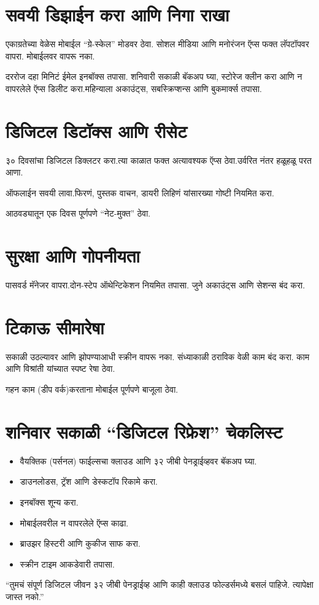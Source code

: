 \section*{सवयी डिझाईन करा आणि निगा राखा}

एकाग्रतेच्या वेळेस मोबाईल “ग्रे-स्केल” मोडवर ठेवा. सोशल मीडिया आणि मनोरंजन ऍप्स फक्त लॅपटॉपवर वापरा.
मोबाईलवर वापरू नका.

दररोज दहा मिनिटं ईमेल इनबॉक्स तपासा. शनिवारी सकाळी बॅकअप घ्या, स्टोरेज क्लीन करा आणि न वापरलेले ऍप्स डिलीट करा.महिन्याला अकाउंट्स, सबस्क्रिप्शन्स आणि बुकमार्क्स तपासा.


\section*{डिजिटल डिटॉक्स आणि रीसेट}

३० दिवसांचा डिजिटल डिक्लटर  करा.त्या काळात फक्त अत्यावश्यक ऍप्स ठेवा.उर्वरित नंतर हळूहळू परत आणा.

ऑफलाईन सवयी लावा.फिरणं, पुस्तक वाचन, डायरी लिहिणं यांसारख्या गोष्टी नियमित करा.

आठवड्यातून एक दिवस पूर्णपणे “नेट-मुक्त” ठेवा.



\section*{सुरक्षा आणि गोपनीयता}

पासवर्ड मॅनेजर वापरा.दोन-स्टेप ऑथेन्टिकेशन नियमित तपासा. जुने अकाउंट्स आणि सेशन्स बंद करा.



\section*{टिकाऊ सीमारेषा}

सकाळी उठल्यावर आणि झोपण्याआधी स्क्रीन वापरू नका. संध्याकाळी ठराविक वेळी काम बंद करा. काम आणि विश्रांती यांच्यात स्पष्ट रेषा ठेवा.

गहन काम (डीप वर्क)करताना मोबाईल पूर्णपणे बाजूला ठेवा.



\section*{शनिवार सकाळी “डिजिटल रिफ्रेश” चेकलिस्ट}

\begin{itemize}
\item  वैयक्तिक (पर्सनल) फाईल्सचा क्लाउड आणि ३२ जीबी  पेनड्राईव्हवर बॅकअप घ्या.
\item  डाउनलोडस, ट्रॅश  आणि डेस्कटॉप रिकामे करा.
\item इनबॉक्स शून्य करा.
\item मोबाईलवरील न वापरलेले ऍप्स काढा.
\item ब्राउझर हिस्टरी आणि कुकीज साफ करा.
\item स्क्रीन टाइम आकडेवारी तपासा.
\end{itemize}


“तुमचं संपूर्ण डिजिटल जीवन ३२ जीबी  पेनड्राईव्ह आणि काही क्लाउड फोल्डर्समध्ये बसलं पाहिजे. त्यापेक्षा जास्त नको.”
